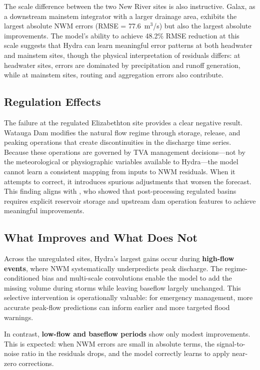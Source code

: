 \documentclass[draft]{agujournal2019}
\begin{document}
The scale difference between the two New River sites is also instructive. Galax, as a downstream mainstem integrator with a larger drainage area, exhibits the largest absolute NWM errors (RMSE = 77.6~m$^3$/s) but also the largest absolute improvements. The model's ability to achieve 48.2\% RMSE reduction at this scale suggests that Hydra can learn meaningful error patterns at both headwater and mainstem sites, though the physical interpretation of residuals differs: at headwater sites, errors are dominated by precipitation and runoff generation, while at mainstem sites, routing and aggregation errors also contribute.

\subsection{Regulation Effects}

The failure at the regulated Elizabethton site provides a clear negative result. Watauga Dam modifies the natural flow regime through storage, release, and peaking operations that create discontinuities in the discharge time series. Because these operations are governed by TVA management decisions---not by the meteorological or physiographic variables available to Hydra---the model cannot learn a consistent mapping from inputs to NWM residuals. When it attempts to correct, it introduces spurious adjustments that worsen the forecast. This finding aligns with , who showed that post-processing regulated basins requires explicit reservoir storage and upstream dam operation features to achieve meaningful improvements.

\subsection{What Improves and What Does Not}

Across the unregulated sites, Hydra's largest gains occur during \textbf{high-flow events}, where NWM systematically underpredicts peak discharge. The regime-conditioned bias and multi-scale convolutions enable the model to add the missing volume during storms while leaving baseflow largely unchanged. This selective intervention is operationally valuable: for emergency management, more accurate peak-flow predictions can inform earlier and more targeted flood warnings.

In contrast, \textbf{low-flow and baseflow periods} show only modest improvements. This is expected: when NWM errors are small in absolute terms, the signal-to-noise ratio in the residuals drops, and the model correctly learns to apply near-zero corrections.
\end{document}
